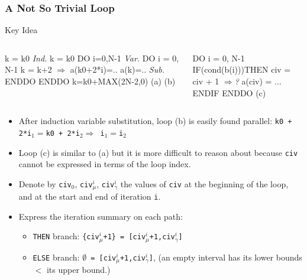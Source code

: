 \documentclass{beamer}
\newcommand{\emp}[1]{\textcolor{DikuRed}{ #1}}
\newcommand{\emphh}[1]{\textcolor{CosGreen}{ #1}}
\newcommand{\mymath}[1]{$ #1 $}
\begin{document}
\begin{frame}[fragile,t]
  \frametitle{A Not So Trivial Loop}

\begin{block}{Key Idea} 
\begin{columns} 
\begin{colorcode}
k = k0     \emphh{\em Ind.}  k = k0        
DO i=0,N-1 \emphh{\em Var.}  DO i = 0, N-1      
  k = k+2    \emphh{\mymath{\Rightarrow}}    a(k0+2*i)=.. 
  a(k)=..  \emphh{\em Sub.}  ENDDO         
ENDDO            k=k0+MAX(2N-2,0)
   (a)               (b) 
\end{colorcode}
\begin{colorcode}
DO i = 0, N-1
 IF(cond(b(i)))THEN 
    civ = civ + 1 \emp{\mymath{\Rightarrow}{\em ?}} 
    a(civ) = ...
ENDIF ENDDO
      (c)
\end{colorcode}

\end{columns}
\end{block}

\begin{itemize}
    \item After induction variable substitution,
            loop (b) is easily found parallel:
          {\tt k0 + 2*i$_1 = $k0 + 2*i$_2 \Rightarrow$ i$_1 = $i$_2$}\pause
    \item Loop (c) is similar to (a) but it is
            more difficult to reason about because
            {\tt civ} cannot be expressed in terms of
            the loop index.
    \item Denote by {\tt civ$_0$}, {\tt civ$_{\mu}^i$}, {\tt civ$_{\gamma}^i$}
            the values of {\tt civ} at the beginning of the loop,
            and at the start and end of iteration {\tt i}.
    \item Express the iteration summary on each path:
        \begin{itemize}
            \item {\tt THEN} branch: {\tt\{civ$_{\mu}^i$+1\}~=~[civ$_{\mu}^i$+1,civ$_{\gamma}^i$]}
            \item {\tt ELSE} branch: {\tt$\emptyset$~=~[civ$_{\mu}^i$+1,civ$_{\gamma}^i$]},
                    (an empty interval has its lower bounds $<$ its upper bound.)
        \end  {itemize}
\end{itemize}

\end{frame}
\end{document}

